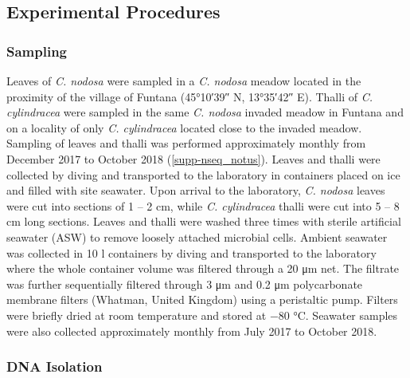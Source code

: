 \documentclass[12pt,]{article}
\begin{document}
\newpage

\hypertarget{experimental-procedures}{%
\subsection{Experimental Procedures}\label{experimental-procedures}}

\hypertarget{sampling}{%
\subsubsection{Sampling}\label{sampling}}

Leaves of \emph{C. nodosa} were sampled in a \emph{C. nodosa} meadow
located in the proximity of the village of Funtana (\ang{45;10;39} N,
\ang{13;35;42} E). Thalli of \emph{C. cylindracea} were sampled in the
same \emph{C. nodosa} invaded meadow in Funtana and on a locality of
only \emph{C. cylindracea} located close to the invaded meadow. Sampling
of leaves and thalli was performed approximately monthly from December
2017 to October 2018 (\autoref{supp-nseq_notus}). Leaves and thalli were
collected by diving and transported to the laboratory in containers
placed on ice and filled with site seawater. Upon arrival to the
laboratory, \emph{C. nodosa} leaves were cut into sections of 1 -- 2
\si{\cm}, while \emph{C. cylindracea} thalli were cut into 5 -- 8
\si{\cm} long sections. Leaves and thalli were washed three times with
sterile artificial seawater (ASW) to remove loosely attached microbial
cells. Ambient seawater was collected in 10 \si{\l} containers by diving
and transported to the laboratory where the whole container volume was
filtered through a 20 \si{\um} net. The filtrate was further
sequentially filtered through 3 \si{\um} and 0.2 \si{\um} polycarbonate
membrane filters (Whatman, United Kingdom) using a peristaltic pump.
Filters were briefly dried at room temperature and stored at \num{-80}
\si{\degreeCelsius}. Seawater samples were also collected approximately
monthly from July 2017 to October 2018.

\hypertarget{dna-isolation}{%
\subsubsection{DNA Isolation}\label{dna-isolation}}
\end{document}
